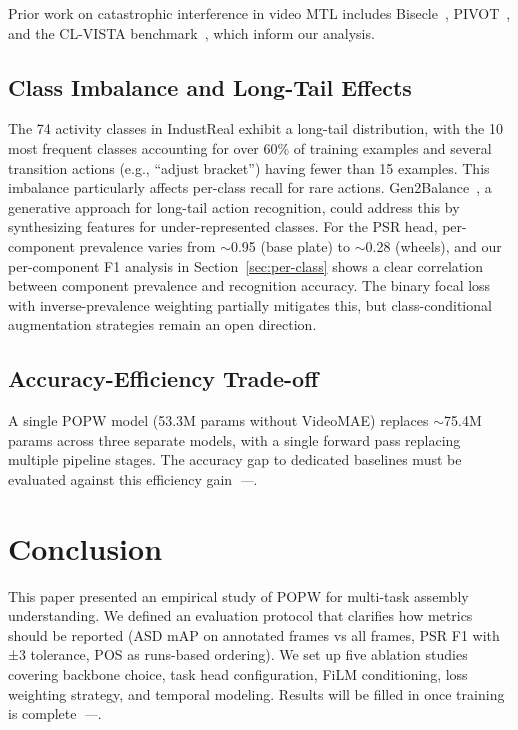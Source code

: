 \documentclass[10pt,journal,compsoc]{IEEEtran}
\newcommand{\popw}{POPW}
\newcommand{\todo}{\textit{---}}
\newcommand{\popwres}{\todo}
\begin{document}
Prior work on catastrophic interference in video MTL includes Bisecle~\cite{tan2025bisecle}, PIVOT~\cite{pivot2023}, and the CL-VISTA benchmark~\cite{clvista2025}, which inform our analysis.

\subsection{Class Imbalance and Long-Tail Effects}

The 74 activity classes in IndustReal exhibit a long-tail distribution, with the 10 most frequent classes accounting for over 60\% of training examples and several transition actions (e.g., ``adjust bracket'') having fewer than 15 examples. This imbalance particularly affects per-class recall for rare actions. Gen2Balance~\cite{zhang2026gen2balance}, a generative approach for long-tail action recognition, could address this by synthesizing features for under-represented classes. For the PSR head, per-component prevalence varies from $\sim$0.95 (base plate) to $\sim$0.28 (wheels), and our per-component F1 analysis in Section~\ref{sec:per-class} shows a clear correlation between component prevalence and recognition accuracy. The binary focal loss with inverse-prevalence weighting partially mitigates this, but class-conditional augmentation strategies remain an open direction.

\subsection{Accuracy-Efficiency Trade-off}

A single \popw{} model (53.3M params without VideoMAE) replaces $\sim$75.4M params across three separate models, with a single forward pass replacing multiple pipeline stages. The accuracy gap to dedicated baselines must be evaluated against this efficiency gain~\popwres.

\FloatBarrier

\section{Conclusion}
\label{sec:conclusion}

This paper presented an empirical study of \popw{} for multi-task assembly understanding. We defined an evaluation protocol that clarifies how metrics should be reported (ASD mAP on annotated frames vs all frames, PSR F1 with ±3 tolerance, POS as runs-based ordering). We set up five ablation studies covering backbone choice, task head configuration, FiLM conditioning, loss weighting strategy, and temporal modeling. Results will be filled in once training is complete~\popwres.
\end{document}
